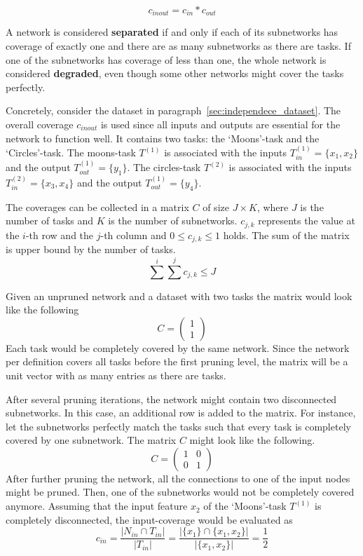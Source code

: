 \[
    c_{inout} = c_{in} * c_{out}
\]

A network is considered \textbf{separated} if and only if each of its subnetworks has coverage of exactly one and there are as many subnetworks as there are tasks.
If one of the subnetworks has coverage of less than one, the whole network is considered \textbf{degraded}, even though some other networks might cover the tasks perfectly.

Concretely, consider the dataset in paragraph~\ref{sec:independece_dataset}.
The overall coverage $c_{inout}$ is used since all inputs and outputs are essential for the network to function well.
It contains two tasks: the `Moons'-task and the `Circles'-task. 
The moons-task $T^{(1)}$ is associated with the inputs $T^{(1)}_{in} = \{x_1,x_2\}$ and the output $T^{(1)}_{out} = \{y_1\}$.
The circles-task $T^{(2)}$ is associated with the inputs $T^{(2)}_{in} = \{x_3,x_4\}$ and the output $T^{(1)}_{out} = \{y_4\}$.

The coverages can be collected in a matrix $C$ of size $J \times K$, where $J$ is the number of tasks and $K$ is the number of subnetworks. 
$c_{j,k}$ represents the value at the $i$-th row and the $j$-th column and $0 \leq c_{j,k} \leq 1$ holds.
The sum of the matrix is upper bound by the number of tasks.
\[
\sum^{i} \sum^{j} c_{j,k} \leq J
\]

Given an unpruned network and a dataset with two tasks the matrix would look like the following 
\[
C = \begin{pmatrix}
    1 \\ 1
\end{pmatrix}
\]
Each task would be completely covered by the same network.
Since the network per definition covers all tasks before the first pruning level, the matrix will be a unit vector with as many entries as there are tasks.

After several pruning iterations, the network might contain two disconnected subnetworks.
In this case, an additional row is added to the matrix.
For instance, let the subnetworks perfectly match the tasks such that every task is completely covered by one subnetwork.
The matrix $C$ might look like the following.
\[
C = \begin{pmatrix}
    1 & 0 \\ 0 & 1
\end{pmatrix}
\]
After further pruning the network, all the connections to one of the input nodes might be pruned.
Then, one of the subnetworks would not be completely covered anymore.
Assuming that the input feature $x_2$ of the `Moons'-task $T^{(1)}$ is completely disconnected, the input-coverage would be evaluated as 
\[
    c_{in} = \frac{|N_{in}  \cap T_{in} |}{|T_{in} |} = \frac{|\{x_1\} \cap \{x_1, x_2\}|}{|\{x_1, x_2\}|} = \frac{1}{2}
\]

